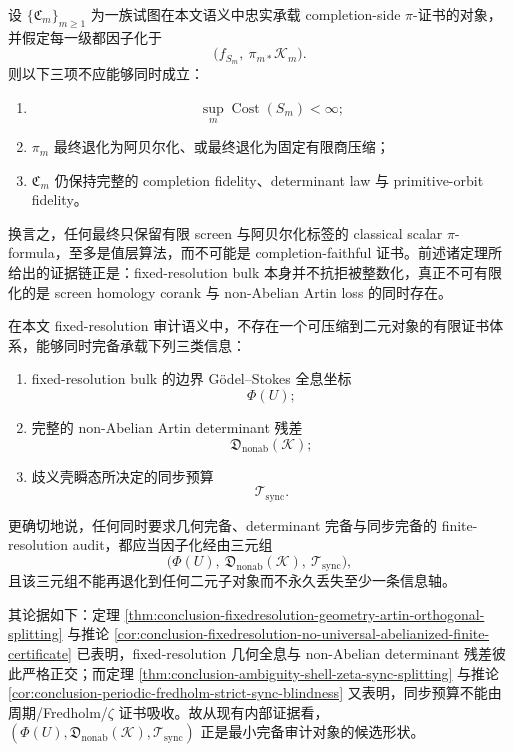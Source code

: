 \begin{conjecture}\label{conj:conclusion-fixedresolution-screen-artin-trilemma}
设 \(\{\mathfrak C_m\}_{m\ge 1}\) 为一族试图在本文语义中忠实承载 completion-side \(\pi\)-证书的对象，并假定每一级都因子化于
\[
\bigl(f_{S_m},\ \pi_{m\ast}\mathcal K_m\bigr).
\]
则以下三项不应能够同时成立：
\begin{enumerate}
  \item
        \[
        \sup_m \operatorname{Cost}(S_m)<\infty;
        \]
  \item \(\pi_m\) 最终退化为阿贝尔化、或最终退化为固定有限商压缩；
  \item \(\mathfrak C_m\) 仍保持完整的 completion fidelity、determinant law 与 primitive-orbit fidelity。
\end{enumerate}
换言之，任何最终只保留有限 screen 与阿贝尔化标签的 classical scalar \(\pi\)-formula，至多是值层算法，而不可能是 completion-faithful 证书。前述诸定理所给出的证据链正是：fixed-resolution bulk 本身并不抗拒被整数化，真正不可有限化的是 screen homology corank 与 non-Abelian Artin loss 的同时存在。
\end{conjecture}

\begin{conjecture}\label{conj:conclusion-fixedresolution-ternary-minimal-complete-audit-kernel}
在本文 fixed-resolution 审计语义中，不存在一个可压缩到二元对象的有限证书体系，能够同时完备承载下列三类信息：
\begin{enumerate}
  \item fixed-resolution bulk 的边界 Gödel--Stokes 全息坐标
        \[
        \Phi(U);
        \]
  \item 完整的 non-Abelian Artin determinant 残差
        \[
        \mathfrak D_{\mathrm{nonab}}(\mathcal K);
        \]
  \item 歧义壳瞬态所决定的同步预算
        \[
        \mathcal T_{\mathrm{sync}}.
        \]
\end{enumerate}
更确切地说，任何同时要求几何完备、determinant 完备与同步完备的 finite-resolution audit，都应当因子化经由三元组
\[
\bigl(\Phi(U),\ \mathfrak D_{\mathrm{nonab}}(\mathcal K),\ \mathcal T_{\mathrm{sync}}\bigr),
\]
且该三元组不能再退化到任何二元子对象而不永久丢失至少一条信息轴。
\end{conjecture}

\noindent
其论据如下：定理 \ref{thm:conclusion-fixedresolution-geometry-artin-orthogonal-splitting} 与推论 \ref{cor:conclusion-fixedresolution-no-universal-abelianized-finite-certificate} 已表明，fixed-resolution 几何全息与 non-Abelian determinant 残差彼此严格正交；而定理 \ref{thm:conclusion-ambiguity-shell-zeta-sync-splitting} 与推论 \ref{cor:conclusion-periodic-fredholm-strict-sync-blindness} 又表明，同步预算不能由周期/Fredholm/\(\zeta\) 证书吸收。故从现有内部证据看，\((\Phi(U),\mathfrak D_{\mathrm{nonab}}(\mathcal K),\mathcal T_{\mathrm{sync}})\) 正是最小完备审计对象的候选形状。

